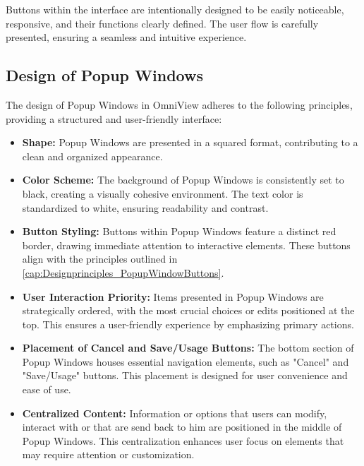 \documentclass{scrreprt}
\begin{document}
Buttons within the interface are intentionally designed to be easily noticeable, responsive, and their functions clearly defined. The user flow is carefully presented, ensuring a seamless and intuitive experience.

\subsection{Design of Popup Windows}\label{cap:Designprinciples_Popupwindows}

The design of Popup Windows in OmniView adheres to the following principles, providing a structured and user-friendly interface:

\begin{itemize}
    \item \textbf{Shape:} Popup Windows are presented in a squared format, contributing to a clean and organized appearance.
    
    \item \textbf{Color Scheme:} The background of Popup Windows is consistently set to black, creating a visually cohesive environment. The text color is standardized to white, ensuring readability and contrast.
    
    \item \textbf{Button Styling:} Buttons within Popup Windows feature a distinct red border, drawing immediate attention to interactive elements. These buttons align with the principles outlined in \ref{cap:Designprinciples_PopupWindowButtons}.
    
    \item \textbf{User Interaction Priority:} Items presented in Popup Windows are strategically ordered, with the most crucial choices or edits positioned at the top. This ensures a user-friendly experience by emphasizing primary actions.
    
    \item \textbf{Placement of Cancel and Save/Usage Buttons:} The bottom section of Popup Windows houses essential navigation elements, such as "Cancel" and "Save/Usage" buttons. This placement is designed for user convenience and ease of use.
    
    \item \textbf{Centralized Content:} Information or options that users can modify, interact with or that are send back to him are positioned in the middle of Popup Windows. This centralization enhances user focus on elements that may require attention or customization.
\end{itemize}
\end{document}
